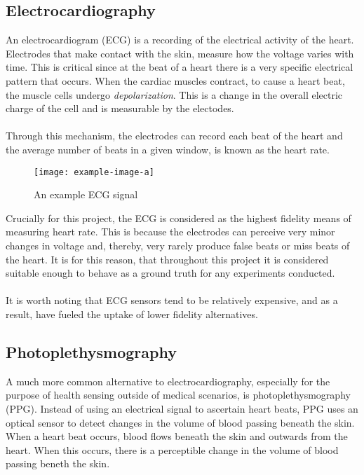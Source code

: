 \subsection{Electrocardiography}
An electrocardiogram (ECG) is a recording of the electrical activity of the heart. Electrodes that make contact with the skin, measure how the voltage varies with time.
This is critical since at the beat of a heart there is a very specific electrical pattern that occurs. When the cardiac muscles contract, to cause a heart beat, the muscle cells undergo
\textit{depolarization}. This is a change in the overall electric charge of the cell and is measurable by the electodes. \\\\
Through this mechanism, the electrodes can record each beat of the heart and the average number of beats in a given window, is known as the heart rate.
\begin{figure}[H]
    \texttt{[image: example-image-a]}
   \caption{An example ECG signal} 
\end{figure}
\noindent
Crucially for this project, the ECG is considered as the highest fidelity means of measuring heart rate. This is because the electrodes can perceive very minor changes in voltage and, thereby, very rarely produce false beats or miss beats of the heart. It is for this reason, that throughout this project it is considered suitable enough to behave as a ground truth for any experiments conducted.
\\\\
It is worth noting that ECG sensors tend to be relatively expensive, and as a result, have fueled the uptake of lower fidelity alternatives.

\subsection{Photoplethysmography}

A much more common alternative to electrocardiography, especially for the purpose of health sensing outside of medical scenarios, is photoplethysmography (PPG).
Instead of using an electrical signal to ascertain heart beats, PPG uses an optical sensor to detect changes in the volume of blood passing beneath the skin.
When a heart beat occurs, blood flows beneath the skin and outwards from the heart. When this occurs, there is a perceptible change in the volume of blood passing beneth the skin.
\\\\


